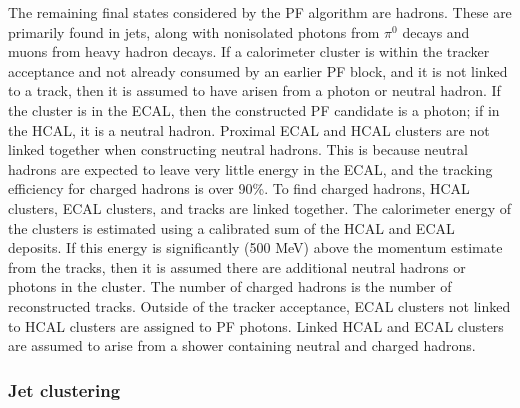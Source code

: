 The remaining final states considered by the PF algorithm are hadrons.
These are primarily found in jets, along with nonisolated photons from $\pi^0$ decays and muons from heavy hadron decays.
If a calorimeter cluster is within the tracker acceptance and not already consumed by an earlier PF block, and it is not linked to a track, then it is assumed to have arisen from a photon or neutral hadron.
If the cluster is in the ECAL, then the constructed PF candidate is a photon; if in the HCAL, it is a neutral hadron.
Proximal ECAL and HCAL clusters are not linked together when constructing neutral hadrons.
This is because neutral hadrons are expected to leave very little energy in the ECAL, and the tracking efficiency for charged hadrons is over 90\%.
To find charged hadrons, HCAL clusters, ECAL clusters, and tracks are linked together.
The calorimeter energy of the clusters is estimated using a calibrated sum of the HCAL and ECAL deposits.
If this energy is significantly (500 MeV) above the momentum estimate from the tracks, then it is assumed there are additional neutral hadrons or photons in the cluster.
The number of charged hadrons is the number of reconstructed tracks.
Outside of the tracker acceptance, ECAL clusters not linked to HCAL clusters are assigned to PF photons.
Linked HCAL and ECAL clusters are assumed to arise from a shower containing neutral and charged hadrons.

\subsubsection{Jet clustering}

